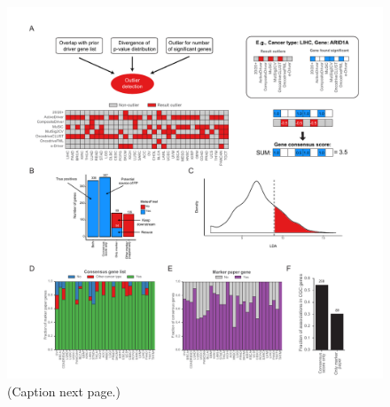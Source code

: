 \begin{figure}[b!]
  \centering
  \makeatletter
  \let\@currsize\normalsize
  \includegraphics[width=\linewidth]{figures/chapter7/driver_gene_approach.pdf}
  \caption[Consensus Gene scores and SMG filtering.]{(Caption next page.)}
  \label{fig:driver_gene_approach}
\end{figure}
\addtocounter{figure}{-1}
